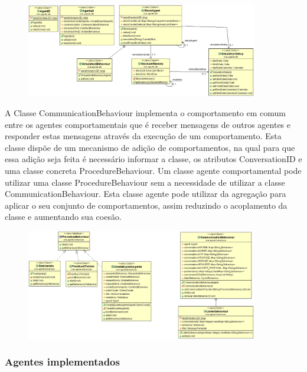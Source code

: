 \begin{apendicesenv}
\begin{figure}[h]
\centering
\label{f3}
\includegraphics[width=0.9\textwidth]{figuras/pacoteAgents_Util}
\end{figure}

A Classe CommunicationBehaviour implementa o comportamento em comum entre os agentes comportamentais que é receber mensagens de outros agentes e responder estas mensagens através da execução de um comportamento. Esta classe dispõe de um mecanismo de adição de comportamentos, na qual para que essa adição seja feita é necessário informar a classe, os atributos ConversationID e uma classe concreta ProcedureBehaviour. Um classe agente comportamental pode utilizar uma classe ProcedureBehaviour sem a necessidade de utilizar a classe CommunicationBehaviour. Esta classe agente pode utilizar da agregação para aplicar o seu conjunto de comportamentos, assim reduzindo o acoplamento da classe e aumentando sua coesão.

\begin{figure}[h]
\centering
\label{f4}
\includegraphics[width=0.9\textwidth]{figuras/pacoteBehaviours}
\end{figure}

\subsubsection{Agentes implementados}


\end{apendicesenv}
